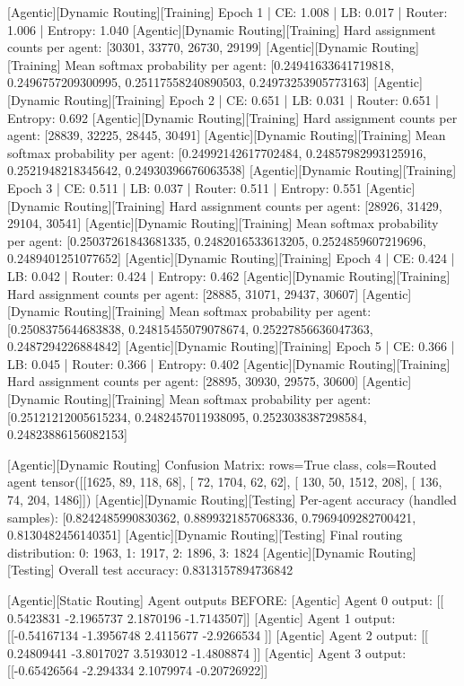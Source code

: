 [Agentic][Dynamic Routing][Training] Epoch 1 | CE: 1.008 | LB: 0.017 | Router: 1.006 | Entropy: 1.040
[Agentic][Dynamic Routing][Training] Hard assignment counts per agent: [30301, 33770, 26730, 29199]
[Agentic][Dynamic Routing][Training] Mean softmax probability per agent: [0.24941633641719818, 0.2496757209300995, 0.25117558240890503, 0.24973253905773163]
[Agentic][Dynamic Routing][Training] Epoch 2 | CE: 0.651 | LB: 0.031 | Router: 0.651 | Entropy: 0.692
[Agentic][Dynamic Routing][Training] Hard assignment counts per agent: [28839, 32225, 28445, 30491]
[Agentic][Dynamic Routing][Training] Mean softmax probability per agent: [0.24992142617702484, 0.24857982993125916, 0.2521948218345642, 0.24930396676063538]
[Agentic][Dynamic Routing][Training] Epoch 3 | CE: 0.511 | LB: 0.037 | Router: 0.511 | Entropy: 0.551
[Agentic][Dynamic Routing][Training] Hard assignment counts per agent: [28926, 31429, 29104, 30541]
[Agentic][Dynamic Routing][Training] Mean softmax probability per agent: [0.25037261843681335, 0.2482016533613205, 0.2524859607219696, 0.2489401251077652]
[Agentic][Dynamic Routing][Training] Epoch 4 | CE: 0.424 | LB: 0.042 | Router: 0.424 | Entropy: 0.462
[Agentic][Dynamic Routing][Training] Hard assignment counts per agent: [28885, 31071, 29437, 30607]
[Agentic][Dynamic Routing][Training] Mean softmax probability per agent: [0.2508375644683838, 0.24815455079078674, 0.25227856636047363, 0.2487294226884842]
[Agentic][Dynamic Routing][Training] Epoch 5 | CE: 0.366 | LB: 0.045 | Router: 0.366 | Entropy: 0.402
[Agentic][Dynamic Routing][Training] Hard assignment counts per agent: [28895, 30930, 29575, 30600]
[Agentic][Dynamic Routing][Training] Mean softmax probability per agent: [0.25121212005615234, 0.2482457011938095, 0.2523038387298584, 0.24823886156082153]

[Agentic][Dynamic Routing] Confusion Matrix: rows=True class, cols=Routed agent
tensor([[1625,   89,  118,   68],
[  72, 1704,   62,   62],
[ 130,   50, 1512,  208],
[ 136,   74,  204, 1486]])
[Agentic][Dynamic Routing][Testing] Per-agent accuracy (handled samples): [0.8242485990830362, 0.8899321857068336, 0.7969409282700421, 0.8130482456140351]
[Agentic][Dynamic Routing][Testing] Final routing distribution: {0: 1963, 1: 1917, 2: 1896, 3: 1824}
[Agentic][Dynamic Routing][Testing] Overall test accuracy: 0.8313157894736842

[Agentic][Static Routing] Agent outputs BEFORE:
[Agentic] Agent 0 output: [[ 0.5423831 -2.1965737  2.1870196 -1.7143507]]
[Agentic] Agent 1 output: [[-0.54167134 -1.3956748   2.4115677  -2.9266534 ]]
[Agentic] Agent 2 output: [[ 0.24809441 -3.8017027   3.5193012  -1.4808874 ]]
[Agentic] Agent 3 output: [[-0.65426564 -2.294334    2.1079974  -0.20726922]]

